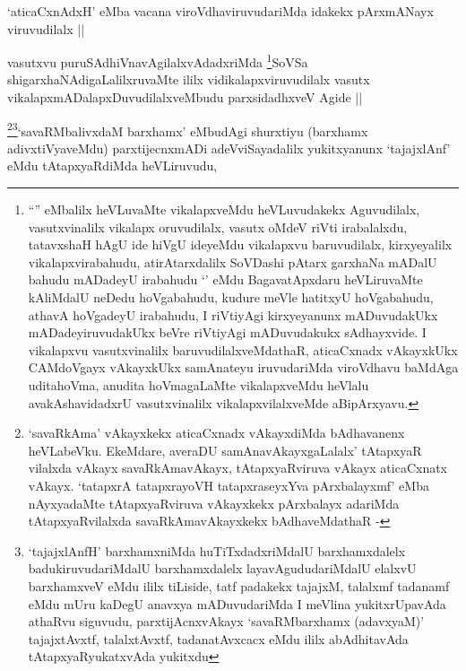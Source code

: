 \begin{artha}
`aticaCxnAdxH' eMba vacana viroVdhaviruvudariMda idakekx pArxmANayx
  viruvudilalx ||
\end{artha}


\begin{artha}
vasutxvu puruSAdhiVnavAgilalxvAdadxriMda \footnote{``\stext'' eMbalilx
  heVLuvaMte vikalapxveMdu heVLuvudakekx Aguvudilalx, vasutxvinalilx
  vikalapx oruvudilalx, vasutx oMdeV riVti irabalalxdu, tatavxshaH
  hAgU ide hiVgU ideyeMdu vikalapxvu baruvudilalx, kirxyeyalilx
  vikalapxvirabahudu, atirAtarxdalilx SoVDashi pAtarx garxhaNa mADalU
  bahudu mADadeyU irabahudu `\stext' eMdu BagavatApxdaru heVLiruvaMte
  kAliMdalU neDedu hoVgabahudu, kudure meVle hatitxyU hoVgabahudu,
  athavA hoVgadeyU irabahudu, I riVtiyAgi kirxyeyanunx mADuvudakUkx
  mADadeyiruvudakUkx beVre riVtiyAgi mADuvudakukx sAdhayxvide. I
  vikalapxvu vasutxvinalilx baruvudilalxveMdathaR, aticaCxnadx
  vAkayxkUkx CAMdoVgayx vAkayxkUkx samAnateyu iruvudariMda viroVdhavu
  baMdAga uditahoVma, anudita hoVmagaLaMte vikalapxveMdu heVlalu
  avakAshavidadxrU vasutxvinalilx vikalapxvilalxveMde aBipArxyavu.}SoVSa
shigarxhaNAdigaLalilxruvaMte ililx vidikalapxviruvudilalx vasutx
vikalapxmADalapxDuvudilalxveMbudu parxsidadhxveV Agide ||
\end{artha}


\begin{artha}
\footnote{`savaRkAma' vAkayxkekx aticaCxnadx vAkayxdiMda bAdhavanenx
  heVLabeVku. EkeMdare, averaDU samAnavAkayxgaLalalx' tAtapxyaR
  vilalxda vAkayx savaRkAmavAkayx, tAtapxyaRviruva vAkayx aticaCxnatx
  vAkayx. `tatapxrA tatapxrayoVH tatapxraseyxYva pArxbalayxmf' eMba
  nAyxyadaMte tAtapxyaRviruva vAkayxkekx pArxbalayx adariMda
  tAtapxyaRvilalxda savaRkAmavAkayxkekx bAdhaveMdathaR
  -}\footnote{`tajajxlAnfH' barxhamxniMda huTiTxdadxriMdalU
  barxhamxdalelx badukiruvudariMdalU barxhamxdalelx
  layavAgududariMdalU elalxvU barxhamxveV eMdu ililx tiLiside, tatf
  padakekx tajajxM, talalxmf tadanamf eMdu mUru kaDegU anavxya
  mADuvudariMda I meVlina yukitxrUpavAda athaRvu siguvudu,
  parxtijAcnxvAkayx `savaRMbarxhamx (adavxyaM)' tajajxtAvxtf,
  talalxtAvxtf, tadanatAvxcacx eMdu ililx abAdhitavAda
  tAtapxyaRyukatxvAda yukitxdu}`savaRMbalivxdaM barxhamx' eMbudAgi shurxtiyu
(barxhamx adivxtiVyaveMdu) parxtijecnxmADi adeVviSayadalilx
yukitxyanunx `tajajxlAnf' eMdu tAtapxyaRdiMda heVLiruvudu, 
\end{artha}

